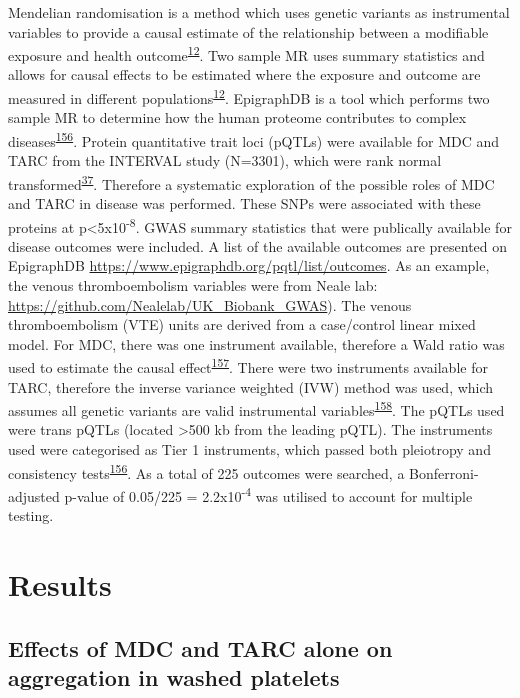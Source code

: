 \documentclass[11pt,twoside]{bristolthesis}
\begin{document}
Mendelian randomisation is a method which uses genetic variants as instrumental variables to provide a causal estimate of the relationship between a modifiable exposure and health outcome\textsuperscript{\protect\hyperlink{ref-Davies2018}{12}}. Two sample MR uses summary statistics and allows for causal effects to be estimated where the exposure and outcome are measured in different populations\textsuperscript{\protect\hyperlink{ref-Davies2018}{12}}. EpigraphDB is a tool which performs two sample MR to determine how the human proteome contributes to complex diseases\textsuperscript{\protect\hyperlink{ref-Zheng2020}{156}}. Protein quantitative trait loci (pQTLs) were available for MDC and TARC from the INTERVAL study (N=3301), which were rank normal transformed\textsuperscript{\protect\hyperlink{ref-Sun2018}{37}}. Therefore a systematic exploration of the possible roles of MDC and TARC in disease was performed. These SNPs were associated with these proteins at p\textless5x10\textsuperscript{-8}. GWAS summary statistics that were publically available for disease outcomes were included. A list of the available outcomes are presented on EpigraphDB \url{https://www.epigraphdb.org/pqtl/list/outcomes}. As an example, the venous thromboembolism variables were from Neale lab: \url{https://github.com/Nealelab/UK_Biobank_GWAS}). The venous thromboembolism (VTE) units are derived from a case/control linear mixed model. For MDC, there was one instrument available, therefore a Wald ratio was used to estimate the causal effect\textsuperscript{\protect\hyperlink{ref-Lawlor2008}{157}}. There were two instruments available for TARC, therefore the inverse variance weighted (IVW) method was used, which assumes all genetic variants are valid instrumental variables\textsuperscript{\protect\hyperlink{ref-Burgess2013}{158}}. The pQTLs used were trans pQTLs (located \textgreater500 kb from the leading pQTL). The instruments used were categorised as Tier 1 instruments, which passed both pleiotropy and consistency tests\textsuperscript{\protect\hyperlink{ref-Zheng2020}{156}}. As a total of 225 outcomes were searched, a Bonferroni-adjusted p-value of 0.05/225 = 2.2x10\textsuperscript{-4} was utilised to account for multiple testing.

\hypertarget{results-2}{%
\section{Results}\label{results-2}}

\hypertarget{effects-of-mdc-and-tarc-alone-on-aggregation-in-washed-platelets}{%
\subsection{Effects of MDC and TARC alone on aggregation in washed platelets}\label{effects-of-mdc-and-tarc-alone-on-aggregation-in-washed-platelets}}
\end{document}
